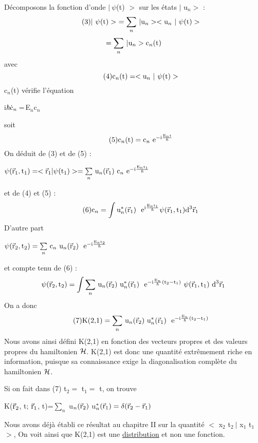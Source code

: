 Décomposons la fonction d'onde $|\ \psi$(t) $>$ sur les états  $|$ u$_n>$ :
\[
\tag{3}|\ \psi(\mt{t})>\ = \underset{n}{\sum}\ | \mt{u}_n>< \mt{u}_n\ |\ \psi\mt{(t)}>
\]
\[
=\underset{n}{\sum}\ | \text{u}_n>\text{c}_n\text{(t)}
\]
avec
\[
\tag{4}\mt{c}_n\mt{(t)}=< \mt{u}_n\ |\ \psi\mt{(t)}>
\]
c$_n$(t) vérifie l'équation
\begin{center}
i$\hbar\dot{\text{c}}_n = $E$_n$c$_n$
\end{center}
soit
\[
\tag{5}\text{c}_n(\text{t})=\text{c}_n\text{ e}^{-\text{i}\frac{\text{E}_n\text{t}}{\hbar}}
\]
On déduit de (3) et de (5) :
\begin{center}
$\psi(\vec{\text{r}}_1,\text{t}_1)=<\vec{\text{r}}_1|\psi(\text{t}_1)>=
\underset{n}{\sum}\ \text{u}_n(\vec{\text{r}}_1)\ \text{c}_n\text{ e}^{-\text{i}\frac{\text{E}_n\text{t}_1}{\hbar}}$
\end{center}
et de (4) et (5) :
\[
\tag{6}\mt{c}_n=\int\mt{u}_n^*(\vec{\mt{r}}_1)\ \mt{ e}^{\mt{i}\frac{\mt{E}_n\mt{t}_1}{\hbar}}
\psi(\vec{\mt{r}}_1,\mt{t}_1)\mt{d}^3\vec{\mt{r}}_1
\]
D'autre part
\begin{center}
$\psi(\vec{\text{r}}_2,\text{t}_2)=
\underset{n}{\sum}\ \text{c}_n\ \text{u}_n(\vec{\text{r}}_2)\ \text{ e}^{-\text{i}\frac{\text{E}_n\text{t}_2}{\hbar}}$
\end{center}
et compte tenu de (6) : 
\[
\psi(\vec{\mt{r}}_2,\mt{t}_2)=\int
\underset{n}{\sum}\ \mt{u}_n(\vec{\mt{r}}_2)\ \mt{u}_n^*(\vec{\mt{r}}_1)\ \mt{ e}^{-\mt{i}
\frac{\mt{E}_n}{\hbar}(\mt{t}_2-\mt{t}_1)}\ \psi(\vec{\mt{r}}_1,\mt{t}_1)\ \mt{d}^3\vec{\mt{r}}_1
\]
On a donc
\[
\tag{7}\mt{K(2,1)}=\underset{n}{\sum}\ \mt{u}_n(\vec{\mt{r}}_2)\ \mt{u}_n^*(\vec{\mt{r}}_1)\ \mt{ e}^{-\mt{i}
\frac{\mt{E}_n}{\hbar}(\mt{t}_2-\mt{t}_1)}
\]
Nous avons ainsi défini K(2,1) en fonction des vecteurs propres et
des valeurs propres du hamiltonien $\mathcal{H}$. K(2,1) est donc une quantité
extrêmement riche en information, puisque sa connaissance exige la diagonalisation complète du hamiltonien $\mathcal{H}$.

Si on fait dans (7) t$_2=$ t$_1=$ t, on trouve
\begin{center}
K($\vec{\text{r}}_2$, t; $\vec{\text{r}}_1$, t)=$\underset{n}{\sum}$ u$_n(\vec{\text{r}}_2)$ u$_n^*(\vec{\text{r}}_1)=
\delta(\vec{\text{r}}_2-\vec{\text{r}}_1)$
\end{center}
Nous avons déjà établi ce résultat au chapitre II sur la quantité
$<$ x$_2$ t$_2\ |$ x$_1$ t$_1$ $>$, On voit ainsi que K(2,1) est une \ul{distribution} et non
une fonction.

